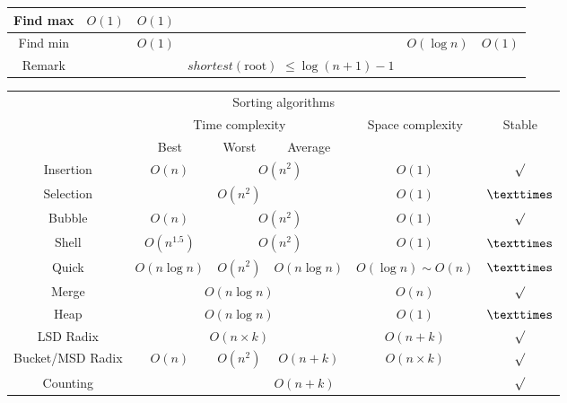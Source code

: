 \begin{enumerate}
\begin{table}[H]
\begin{tabular}{|c|c|c|c|c|c|}
            \hline
            Find max & $O(1)$ & $O(1)$ & & & \\
            \hline
            Find min & & $O(1)$ & & $O(\log n)$ & $O(1)$ \\
            \hline
            Remark & & & \makecell{$shortest(\text{root})$\\$\le \log (n + 1) - 1$} & & \\
            \hline
        \end{tabular}
    \end{table} 
    \begin{table}[H]
        \centering
        \begin{tabular}{|c|c|c|c|c|c|}
            \hline
            \multicolumn{6}{|c|}{Sorting algorithms} \\
            \Xhline{3\arrayrulewidth}
            \multirow{2}{*}{Method} & \multicolumn{3}{c|}{Time complexity} & \multirow{2}{*}{Space complexity} & \multirow{2}{*}{Stable} \\
            \cline{2-4}
            & Best & Worst & Average & & \\
            \Xhline{2\arrayrulewidth}
            Insertion & $O(n)$ & \multicolumn{2}{c|}{$O(n^2)$} & $O(1)$ & $\surd$ \\
            \hline
            Selection & \multicolumn{3}{c|}{$O(n^2)$} & $O(1)$ & $\texttimes$ \\
            \hline
            Bubble & $O(n)$ & \multicolumn{2}{c|}{$O(n^2)$} & $O(1)$ & $\surd$ \\
            \hline
            Shell & $O(n^{1.5})$ & \multicolumn{2}{c|}{$O(n^2)$} & $O(1)$ & $\texttimes$ \\
            \hline
            Quick & $O(n\log n)$ & $O(n^2)$ & $O(n\log n)$ & $O(\log n) \sim O(n)$ & $\texttimes$ \\
            \hline
            Merge & \multicolumn{3}{c|}{$O(n\log n)$} & $O(n)$ & $\surd$ \\
            \hline
            Heap & \multicolumn{3}{c|}{$O(n\log n)$} & $O(1)$ & $\texttimes$ \\
            \hline
            LSD Radix & \multicolumn{3}{c|}{$O(n \times k)$} & $O(n + k)$ & $\surd$ \\
            \hline
            Bucket/MSD Radix & $O(n)$ & $O(n^2)$ & $O(n + k)$ & $O(n \times k)$ & $\surd$ \\
            \hline
            Counting & \multicolumn{4}{c|}{$O(n + k)$} & $\surd$ \\
            \hline
        \end{tabular}
    \end{table}
\end{enumerate}

\pagebreak